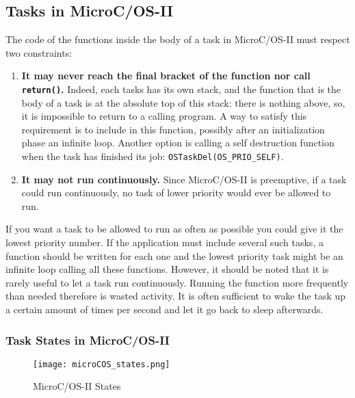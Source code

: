 \documentclass[../main.tex]{subfiles}
\begin{document}
\subsection{Tasks in MicroC/OS-II}
The code of the functions inside the body of a task in MicroC/OS-II must respect two constraints:
\begin{enumerate}
	\item \textbf{It may never reach the final bracket of the function nor call \lstinline{return()}.} Indeed, each tasks has its own stack, and the function that is the body of a task is at the absolute top of this stack: there is nothing above, so, it is impossible to return to a calling program. A way to satisfy this requirement is to include in this function, possibly after an initialization phase an infinite loop. Another option is calling a self destruction function when the task has finished its job: \texttt{OSTaskDel(OS\_PRIO\_SELF)}.
	\item \textbf{It may not run continuously.} Since  MicroC/OS-II is preemptive, if a task could run continuously, no task of lower priority would ever be allowed to run.
\end{enumerate}
If you want a task to be allowed to run as often as possible you could give it the lowest priority number.
If the application must include several such tasks, a function should be written for each one and the lowest priority task might be an infinite loop calling all these functions.
However, it should be noted that it is rarely useful to let a task run continuously.
Running the function more frequently than needed therefore is wasted activity.
It is often sufficient to wake the task up a certain amount of times per second and let it go back to sleep afterwards.

\subsubsection{Task States in MicroC/OS-II}
\begin{figure}[H]
    \centering
    \texttt{[image: microCOS\_states.png]}
    \caption{MicroC/OS-II States}
    \label{mcosii}
\end{figure}
\end{document}
